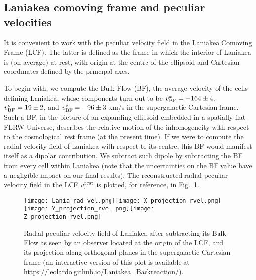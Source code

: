 \documentclass[notitlepage,nofootinbib]{revtex4-1}
\begin{document}
\subsection{Laniakea comoving frame and peculiar velocities}

It is convenient to work with the peculiar velocity field in the Laniakea Comoving Frame (LCF). The latter is defined as the frame in which the interior of Laniakea is (on average) at rest, with origin at the centre of the ellipsoid and Cartesian coordinates defined by the principal axes. 

To begin with, we compute the Bulk Flow (BF), the average velocity of the cells defining Laniakea, whose components turn out to be $v^x_{\rm{BF}}=-164 \pm 4$, $v^y_{\rm{BF}}= 19 \pm 2$, and $v^z_{\rm{BF}}=-96\pm 3$ km/s in the supergalactic Cartesian frame. Such a BF, in the picture of an expanding ellipsoid embedded in a spatially flat FLRW Universe, describes the relative motion of the inhomogeneity with respect to the cosmological rest frame (at the present time).  If we were to compute the radial velocity field of Laniakea with respect to its centre, this BF would manifest itself as a dipolar contribution. We subtract such dipole by subtracting the BF from every cell within Laniakea (note that the uncertainties on the BF value have a negligible impact on our final results). The reconstructed radial peculiar velocity field in the LCF $v_r^{\rm{rcst}}$ is plotted, for reference, in Fig.~\ref{RPV-Lan}.

\begin{figure}[!tbp]
    \centering
	\texttt{[image: Lania\_rad\_vel.png]}\texttt{[image: X\_projection\_rvel.png]} \texttt{[image: Y\_projection\_rvel.png]}\texttt{[image: Z\_projection\_rvel.png]}
	\caption{Radial peculiar velocity field of Laniakea after subtracting its Bulk Flow as seen by an observer located at the origin of the LCF, and its projection along orthogonal planes in the supergalactic Cartesian frame (an interactive version of this plot is available at \href{https://leolardo.github.io/Laniakea_Backreaction/}{https://leolardo.github.io/Laniakea\_Backreaction/}).}
	\label{RPV-Lan}
\end{figure}

\end{document}
